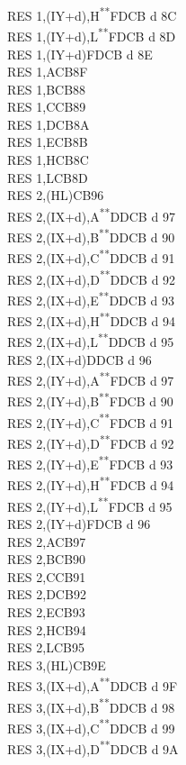 \documentclass[twoside,openright,a4paper]{book}
\newcommand{\UNDOC}{\textnormal{\textsuperscript{**}}}
\begin{document}
\begin{multicols}{3}
{\begin{tabbing}
	RES 1,(IY+d),H\UNDOC\>FDCB d 8C\\
	RES 1,(IY+d),L\UNDOC\>FDCB d 8D\\
	RES 1,(IY+d)\>FDCB d 8E\\
	RES 1,A\>CB8F\\
	RES 1,B\>CB88\\
	RES 1,C\>CB89\\
	RES 1,D\>CB8A\\
	RES 1,E\>CB8B\\
	RES 1,H\>CB8C\\
	RES 1,L\>CB8D\\
	RES 2,(HL)\>CB96\\
	RES 2,(IX+d),A\UNDOC\>DDCB d 97\\
	RES 2,(IX+d),B\UNDOC\>DDCB d 90\\
	RES 2,(IX+d),C\UNDOC\>DDCB d 91\\
	RES 2,(IX+d),D\UNDOC\>DDCB d 92\\
	RES 2,(IX+d),E\UNDOC\>DDCB d 93\\
	RES 2,(IX+d),H\UNDOC\>DDCB d 94\\
	RES 2,(IX+d),L\UNDOC\>DDCB d 95\\
	RES 2,(IX+d)\>DDCB d 96\\
	RES 2,(IY+d),A\UNDOC\>FDCB d 97\\
	RES 2,(IY+d),B\UNDOC\>FDCB d 90\\
	RES 2,(IY+d),C\UNDOC\>FDCB d 91\\
	RES 2,(IY+d),D\UNDOC\>FDCB d 92\\
	RES 2,(IY+d),E\UNDOC\>FDCB d 93\\
	RES 2,(IY+d),H\UNDOC\>FDCB d 94\\
	RES 2,(IY+d),L\UNDOC\>FDCB d 95\\
	RES 2,(IY+d)\>FDCB d 96\\
	RES 2,A\>CB97\\
	RES 2,B\>CB90\\
	RES 2,C\>CB91\\
	RES 2,D\>CB92\\
	RES 2,E\>CB93\\
	RES 2,H\>CB94\\
	RES 2,L\>CB95\\
	RES 3,(HL)\>CB9E\\
	RES 3,(IX+d),A\UNDOC\>DDCB d 9F\\
	RES 3,(IX+d),B\UNDOC\>DDCB d 98\\
	RES 3,(IX+d),C\UNDOC\>DDCB d 99\\
	RES 3,(IX+d),D\UNDOC\>DDCB d 9A\\

\end{tabbing}}
\end{multicols}
\end{document}
